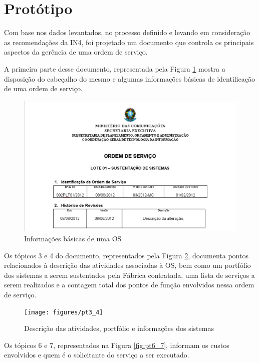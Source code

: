 \section{Protótipo}

Com base nos dados levantados, no processo definido e levando em consideração
as recomendações da IN4, foi projetado um documento que controla os principais
aspectos da gerência de uma ordem de serviço.

A primeira parte desse documento, representada pela Figura \ref{fig:cabecalho_1_2}
mostra a disposição do cabeçalho do mesmo e algumas informações básicas de 
identificação de uma ordem de serviço.

\begin{figure}[H]
  \centering
  \includegraphics[keepaspectratio=true,scale=0.5]{figures/cabecalho_1_2}
  \caption{Informações básicas de uma OS \label{fig:cabecalho_1_2}}
\end{figure}

Os tópicos 3 e 4 do documento, representados pela Figura \ref{fig:pt3_4}, documenta
pontos relacionados à descrição das atividades associadas à OS, bem como um portfólio
dos sistemas a serem sustentados pela Fábrica contratada, uma lista de serviços a serem
realizados e a contagem total dos pontos de função envolvidos nessa ordem de serviço.

\begin{figure}[H]
  \centering
  \texttt{[image: figures/pt3\_4]}
  \caption{Descrição das atividades, portfólio e informações dos sistemas \label{fig:pt3_4}}
\end{figure}

Os tópicos 6 e 7, representados na Figura \ref{fig:pt6_7}, informam os custos envolvidos
e quem é o solicitante do serviço a ser executado.

